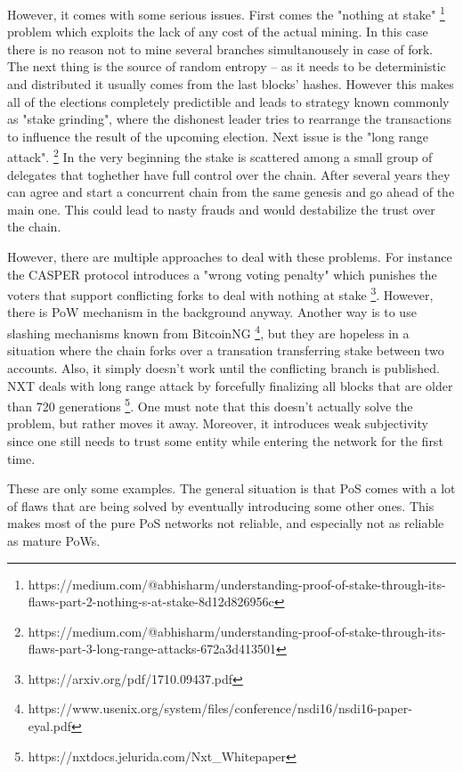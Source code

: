 However, it comes with some serious issues. First comes the "nothing at stake"
\footnote{https://medium.com/@abhisharm/understanding-proof-of-stake-through-its-flaws-part-2-nothing-s-at-stake-8d12d826956c}
problem which exploits the lack of any cost of the actual mining. In this case
there is no reason not to mine several branches simultanousely in case of fork.
The next thing is the source of random entropy – as it needs to be deterministic
and distributed it usually comes from the last blocks' hashes. However this
makes all of the elections completely predictible and leads to strategy known
commonly as "stake grinding", where the dishonest leader tries to rearrange the
transactions to influence the result of the upcoming election. Next issue is the
"long range attack".
\footnote{https://medium.com/@abhisharm/understanding-proof-of-stake-through-its-flaws-part-3-long-range-attacks-672a3d413501}
In the very beginning the stake is scattered among a small
group of delegates that toghether have full control over the chain. After
several years they can agree and start a concurrent chain from the same genesis
and go ahead of the main one. This could lead to nasty frauds and would
destabilize the trust over the chain.

However, there are multiple approaches to deal with these problems. For instance
the CASPER protocol introduces a "wrong voting penalty" which punishes the
voters that support conflicting forks to deal with nothing at stake
\footnote{https://arxiv.org/pdf/1710.09437.pdf}.
However, there is PoW mechanism in the background anyway. Another way is to use
slashing mechanisms known from BitcoinNG
\footnote{https://www.usenix.org/system/files/conference/nsdi16/nsdi16-paper-eyal.pdf},
but they are hopeless in a situation where the chain forks over a transation
transferring stake between two accounts. Also, it simply doesn't work until the
conflicting branch is published. NXT deals with long range attack by forcefully
finalizing all blocks that are older than 720 generations
\footnote{https://nxtdocs.jelurida.com/Nxt_Whitepaper}.
One must note that this doesn't actually solve the problem, but rather moves it
away. Moreover, it introduces weak subjectivity since one still needs to trust
some entity while entering the network for the first time.

These are only some examples. The general situation is that PoS comes with a lot
of flaws that are being solved by eventually introducing some other ones. This
makes most of the pure PoS networks not reliable, and especially not as reliable
as mature PoWs.